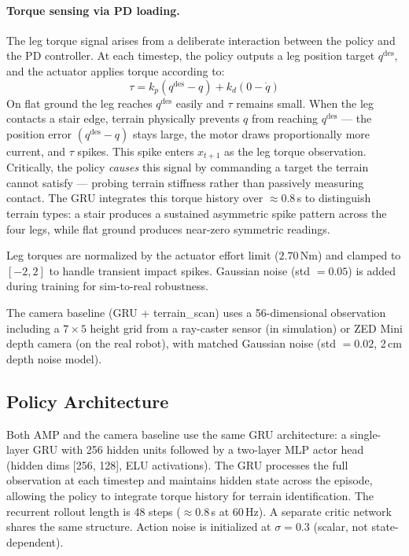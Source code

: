 \documentclass{article}
\begin{document}
\paragraph{Torque sensing via PD loading.}
The leg torque signal arises from a deliberate interaction between the policy and the
PD controller. At each timestep, the policy outputs a leg position target $q^\text{des}$,
and the actuator applies torque according to:
\begin{equation}
    \tau = k_p (q^\text{des} - q) + k_d (0 - \dot{q})
    \label{eq:pd}
\end{equation}
On flat ground the leg reaches $q^\text{des}$ easily and $\tau$ remains small. When
the leg contacts a stair edge, terrain physically prevents $q$ from reaching $q^\text{des}$
--- the position error $(q^\text{des} - q)$ stays large, the motor draws proportionally
more current, and $\tau$ spikes. This spike enters $x_{t+1}$ as the leg torque observation.
Critically, the policy \emph{causes} this signal by commanding a target the terrain cannot
satisfy --- probing terrain stiffness rather than passively measuring contact. The GRU
integrates this torque history over $\approx 0.8$\,s to distinguish terrain types: a stair
produces a sustained asymmetric spike pattern across the four legs, while flat ground
produces near-zero symmetric readings.

Leg torques are normalized by the actuator effort limit ($2.70$\,Nm) and clamped to
$[-2, 2]$ to handle transient impact spikes. Gaussian noise (std $= 0.05$) is added
during training for sim-to-real robustness.

The camera baseline (GRU + terrain\_scan) uses a 56-dimensional observation including a
$7\times5$ height grid from a ray-caster sensor (in simulation) or ZED Mini depth camera
(on the real robot), with matched Gaussian noise (std $= 0.02$, 2\,cm depth noise model).

\subsection{Policy Architecture}

Both AMP and the camera baseline use the same GRU architecture: a single-layer GRU
with 256 hidden units followed by a two-layer MLP actor head (hidden dims [256, 128], ELU
activations). The GRU processes the full observation at each timestep and maintains hidden
state across the episode, allowing the policy to integrate torque history for terrain
identification. The recurrent rollout length is 48 steps ($\approx 0.8$\,s at 60\,Hz).
A separate critic network shares the same structure. Action noise is initialized at
$\sigma = 0.3$ (scalar, not state-dependent).
\end{document}
